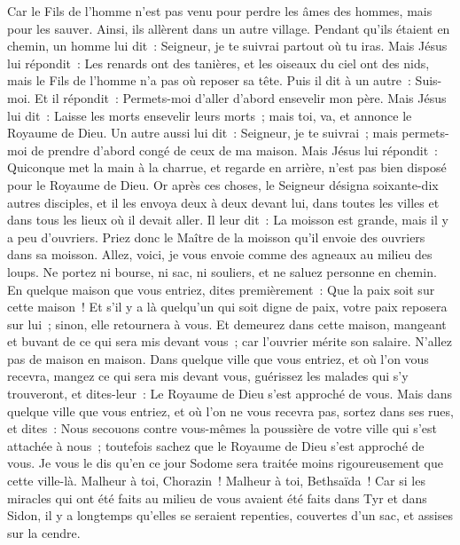 \begin{multicols}{2}
Car le Fils de l'homme n'est pas venu pour perdre les âmes des hommes, mais pour les sauver. Ainsi, ils allèrent dans un autre village.
Pendant qu'ils étaient en chemin, un homme lui dit~: Seigneur, je te suivrai partout où tu iras.
Mais Jésus lui répondit~: Les renards ont des tanières, et les oiseaux du ciel ont des nids, mais le Fils de l'homme n'a pas où reposer sa tête.
Puis il dit à un autre~: Suis-moi. Et il répondit~: Permets-moi d'aller d'abord ensevelir mon père.
Mais Jésus lui dit~: Laisse les morts ensevelir leurs morts~; mais toi, va, et annonce le Royaume de Dieu.
Un autre aussi lui dit~: Seigneur, je te suivrai~; mais permets-moi de prendre d'abord congé de ceux de ma maison.
Mais Jésus lui répondit~: Quiconque met la main à la charrue, et regarde en arrière, n'est pas bien disposé pour le Royaume de Dieu.
\VerseOne{}Or après ces choses, le Seigneur désigna soixante-dix autres disciples, et il les envoya deux à deux devant lui, dans toutes les villes et dans tous les lieux où il devait aller.
Il leur dit~: La moisson est grande, mais il y a peu d'ouvriers. Priez donc le Maître de la moisson qu'il envoie des ouvriers dans sa moisson.
Allez, voici, je vous envoie comme des agneaux au milieu des loups.
Ne portez ni bourse, ni sac, ni souliers, et ne saluez personne en chemin.
En quelque maison que vous entriez, dites premièrement~: Que la paix soit sur cette maison~!
Et s'il y a là quelqu'un qui soit digne de paix, votre paix reposera sur lui~; sinon, elle retournera à vous.
Et demeurez dans cette maison, mangeant et buvant de ce qui sera mis devant vous~; car l'ouvrier mérite son salaire. N'allez pas de maison en maison.
Dans quelque ville que vous entriez, et où l'on vous recevra, mangez ce qui sera mis devant vous,
guérissez les malades qui s'y trouveront, et dites-leur~: Le Royaume de Dieu s'est approché de vous.
Mais dans quelque ville que vous entriez, et où l'on ne vous recevra pas, sortez dans ses rues, et dites~:
Nous secouons contre vous-mêmes la poussière de votre ville qui s'est attachée à nous~; toutefois sachez que le Royaume de Dieu s'est approché de vous.
Je vous le dis qu'en ce jour Sodome sera traitée moins rigoureusement que cette ville-là.
Malheur à toi, Chorazin~! Malheur à toi, Bethsaïda~! Car si les miracles qui ont été faits au milieu de vous avaient été faits dans Tyr et dans Sidon, il y a longtemps qu'elles se seraient repenties, couvertes d'un sac, et assises sur la cendre.

\end{multicols}
